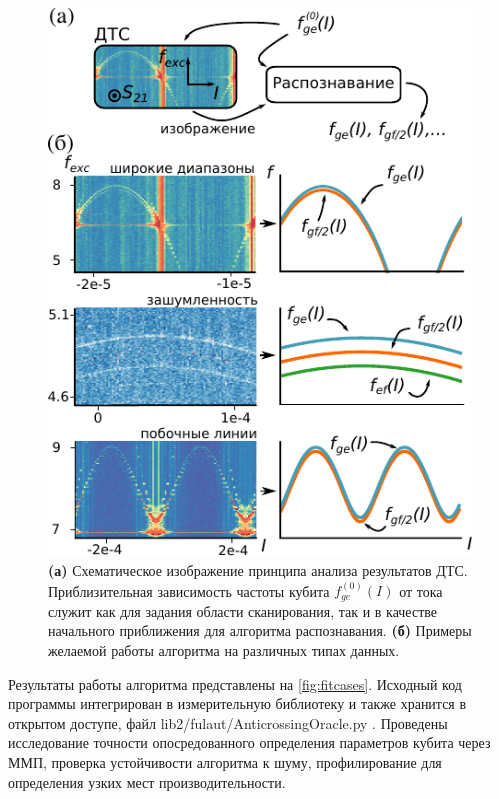 \documentclass[14pt, a4paper]{extarticle}
\begin{document}
\begin{figure}[t]
	\centering
	\includegraphics[width=0.6\linewidth]{Pictures/detection_tts}
	\caption{\textbf{(а)} Схематическое изображение принципа анализа результатов ДТС. Приблизительная зависимость частоты кубита $f_{ge}^{(0)}(I)$ от тока служит как для задания области сканирования, так и в качестве начального приближения для алгоритма распознавания. \textbf{(б)} Примеры желаемой работы алгоритма на различных типах данных.}
	\label{fig:detectiontts}
\end{figure}

Результаты работы алгоритма представлены на \autoref{fig:fitcases}. Исходный код программы интегрирован в измерительную библиотеку и также хранится в открытом доступе, файл \foreignlanguage{english}{lib2/fulaut/AnticrossingOracle.py} \cite{fedorov2021github}. Проведены исследование точности опосредованного определения параметров кубита через ММП, проверка устойчивости алгоритма к шуму, профилирование для определения узких мест производительности.
\end{document}
